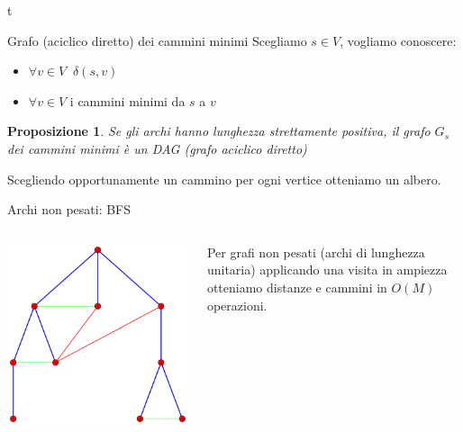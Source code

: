 t \documentclass{beamer}
\newcounter{counter1}
\theoremstyle{plain}
\newtheorem{mypro}[counter1]{Proposizione}
\theoremstyle{definition}
\theoremstyle{remark}
\newcommand{\pa}[1]{\left(#1\right)}
\begin{document}
\begin{frame}{Grafo (aciclico diretto) dei cammini minimi}
  Scegliamo $s\in V$, vogliamo conoscere:
  \begin{itemize}
  \item $\forall v\in V\;\; \delta \pa{s,v}$
  \item $\forall v\in V$ i cammini minimi da $s$ a $v$
  \end{itemize}

  \begin{mypro}
    Se gli archi hanno lunghezza strettamente positiva, il grafo $G_s$
    dei cammini minimi \`e un DAG (grafo aciclico diretto)
  \end{mypro}
  Scegliendo opportunamente un cammino per ogni vertice otteniamo un
  albero.
\end{frame}

\begin{frame}{Archi non pesati: BFS}
    \begin{columns}
    \begin{column}{0.40\textwidth}
      \includegraphics[width=\textwidth]{BFS}
    \end{column}
    \begin{column}{0.58\textwidth}
      Per grafi non pesati (archi di lunghezza unitaria) applicando
      una visita in ampiezza otteniamo distanze e cammini in
      $O\pa{M}$ operazioni.
    \end{column}
  \end{columns}
\end{frame}
\end{document}

